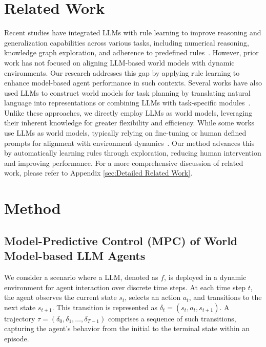 \documentclass{article} %
\begin{document}
\section{Related Work}

Recent studies have integrated LLMs with rule learning to improve reasoning and generalization capabilities across various tasks, including numerical reasoning, knowledge graph exploration, and adherence to predefined rules~\citep{yang2023enabling, Zhu2023Large, mu2023can, yang2023failures, luo2023chatrule}. However, prior work has not focused on aligning LLM-based world models with dynamic environments. Our research addresses this gap by applying rule learning to enhance model-based agent performance in such contexts.
Several works have also used LLMs to construct world models for task planning by translating natural language into representations or combining LLMs with task-specific modules~\citep{wong2023learning, guan2023leveraging, tang2024worldcoder}. Unlike these approaches, we directly employ LLMs as world models, leveraging their inherent knowledge for greater flexibility and efficiency.
While some works use LLMs as world models, typically relying on fine-tuning or human defined prompts for alignment with environment dynamics~\citep{xiang2024language, xie2024making, zhao2024large, hao2023reasoning, liu2023reason}. Our method advances this by automatically learning rules through exploration, reducing human intervention and improving performance. 
For a more comprehensive discussion of related work, please refer to Appendix \ref{sec:Detailed Related Work}.

\section{Method}

\subsection{Model-Predictive Control (MPC) of World Model-based LLM Agents}

We consider a scenario where a LLM, denoted as $f$, is deployed in a dynamic environment for agent interaction over discrete time steps. At each time step $t$, the agent observes the current state $s_t$, selects an action $a_t$, and transitions to the next state $s_{t+1}$. This transition is represented as $\delta_t = (s_t, a_t, s_{t+1})$. A trajectory $\tau = (\delta_0, \delta_1, \ldots, \delta_{T-1})$ comprises a sequence of such transitions, capturing the agent's behavior from the initial to the terminal state within an episode.
\end{document}
